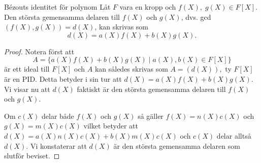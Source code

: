 \documentclass{article}
\theoremstyle{definition}
\begin{document}
\hypertarget{Bézouts identitet}{}
\begin{mylemma}{Bézouts identitet för polynom}{}
  Låt $F$ vara en kropp och $f(X), \; g(X) \in F[X]$. Den största gemensamma delaren till $f(X)$ och $g(X)$, dvs. gcd$(f(X), g(X)) = d(X)$, kan skrivas som 
  \[d(X) = a(X)f(X) + b(X)g(X).\]
\end{mylemma}

\begin{proof}
  Notera först att 
  \[A = \{ a(X)f(X) + b(X)g(X) \; | \; a(X), b(X) \in F[X] \}\]
  är ett ideal till $F[X]$ och $A$ kan således skrivas som $A = (d(X)),$ ty $F[X]$ är en PID. Detta betyder i sin tur att 
  $d(X) = a(X)f(X) + b(X)g(X)$. Vi visar nu att $d(X)$ faktiskt är den största gemensamma delaren till $f(X)$ och $g(X)$.
  
  Om $c(X)$ delar både $f(X)$ och $g(X)$ så gäller $f(X) = n(X)c(X)$ och $g(X) = m(X)c(X)$ vilket betyder att 
  $d(X) = a(X)n(X)c(X) + b(X)m(X)c(X)$ och $c(X)$ delar alltså $d(X)$. Vi konstaterar att $d(X)$ är den största gemensamma delaren som 
  slutför beviset.
\end{proof}
\end{document}
